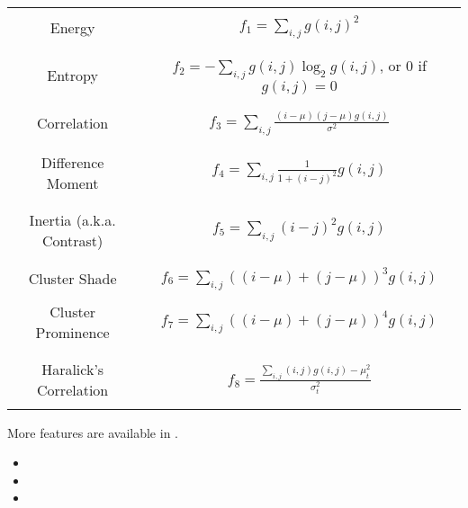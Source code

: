 \begin{table}
\begin{center}
\begin{tabular}{|c|c|}
\hline
& \\
Energy & $ f_1 = \sum_{i,j}g(i, j)^2 $ \\
& \\
\hline
& \\
Entropy & $ f_2 = -\sum_{i,j}g(i, j) \log_2 g(i, j)$, or 0 if $g(i, j) = 0$ \\
& \\
\hline
& \\
Correlation & $ f_3 = \sum_{i,j}\frac{(i - \mu)(j - \mu)g(i, j)}{\sigma^2} $ \\
& \\
\hline
& \\
Difference Moment &  $f_4 = \sum_{i,j}\frac{1}{1 + (i - j)^2}g(i, j) $ \\
& \\
\hline
& \\
Inertia (a.k.a. Contrast) & $ f_5 = \sum_{i,j}(i - j)^2g(i, j) $ \\
& \\
\hline
& \\
Cluster Shade & $ f_6 = \sum_{i,j}((i - \mu) + (j - \mu))^3 g(i, j) $ \\
& \\
\hline
Cluster Prominence & $ f_7 = \sum_{i,j}((i - \mu) + (j - \mu))^4 g(i, j) $ \\
& \\
\hline
& \\
Haralick's Correlation & $ f_8 = \frac{\sum_{i,j}(i, j) g(i, j) -\mu_t^2}{\sigma_t^2} $ \\
& \\
\hline
\end{tabular}
\end{center}
\label{tab:haralickStandardFeatures}
\end{table}

More features are available in .
\relatedClasses
\begin{itemize}
\item {}
\item {}
\item {}
\end{itemize}

